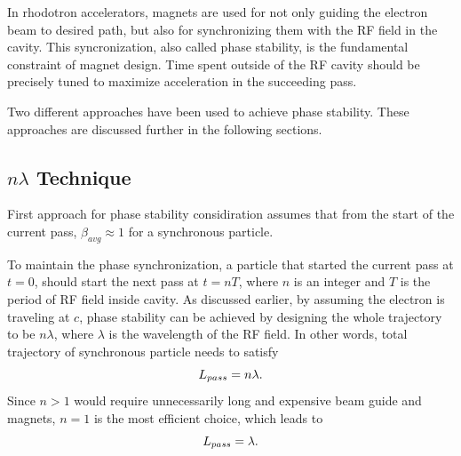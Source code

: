 \documentclass[a4paper,oneside,12pt]{report}
\numberwithin{equation}{chapter}
\begin{document}
In rhodotron accelerators, magnets are used for not only guiding the electron beam to desired path, but also for synchronizing them with the RF field in the cavity. 
This syncronization, also called phase stability, is the fundamental constraint of magnet design. 
Time spent outside of the RF cavity should be precisely tuned to maximize acceleration in the succeeding pass. 

Two different approaches have been used to achieve phase stability.
These approaches are discussed further in the following sections.

\subsection{$n\lambda$ Technique} \label{sec:n_L_technique}

First approach for phase stability considiration assumes that from the start of the current pass, $\beta_{avg} \approx 1$ for a synchronous particle. 

To maintain the phase synchronization, a particle that started the current pass at $t=0$, should start the next pass at $t=nT$, where $n$ is an integer and $T$ is the period of RF field inside cavity.
As discussed earlier, by assuming the electron is traveling at $c$, phase stability can be achieved by designing the whole trajectory to be $n \lambda$, where $\lambda$ is the wavelength of the RF field. 
In other words, total trajectory of synchronous particle needs to satisfy
\vspace{-10pt}\begin{equation}
    L_{pass} = n \lambda .
\vspace{-10pt}\end{equation} 
Since $n>1$ would require unnecessarily long and expensive beam guide and magnets, $n=1$ is the most efficient choice, which leads to
\vspace{-10pt}\begin{equation}
    L_{pass} = \lambda .
\vspace{-10pt}\end{equation} 
\end{document}
